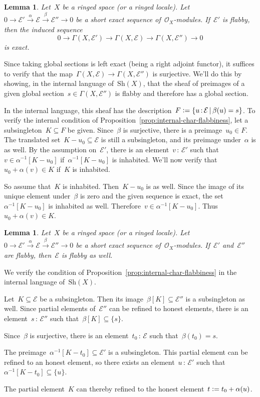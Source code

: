 \documentclass[10pt,reqno,a4paper]{amsbook}
\makeatletter
\theoremstyle{definition}
\theoremstyle{plain}
\newtheorem{lemma}[defn]{Lemma}
\theoremstyle{remark}
\newcommand{\E}{\mathcal{E}}
\renewcommand{\O}{\mathcal{O}}
\newcommand{\Sh}{\mathrm{Sh}}
\newcommand{\?}{\,{:}\,}
\renewcommand{\_}{\mathpunct{.}\,}
\newcommand{\xra}{\xrightarrow}
\newcommand{\defeq}{\vcentcolon=}
\renewenvironment{proof}[1][\proofname]{\par
  \pushQED{\qed}%
  \normalfont \topsep6\p@\@plus6\p@\relax
  \trivlist
  \item[\hskip\labelsep
        \itshape
    #1\@addpunct{.}]\ignorespaces
}{%
  \popQED\endtrivlist\@endpefalse
}
\makeatother
\begin{document}
\begin{lemma}Let~$X$ be a ringed space (or a ringed locale). Let~$0 \to \E'
\xra{\alpha} \E \xra{\beta} \E'' \to 0$ be a short exact sequence
of~$\O_X$-modules. If~$\E'$ is flabby, then the induced sequence
\[ 0 \longrightarrow \Gamma(X,\E')
  \longrightarrow \Gamma(X,\E)
  \longrightarrow \Gamma(X,\E'') \longrightarrow 0 \]
is exact.
\end{lemma}

\begin{proof}Since taking global sections is left exact (being a right adjoint
functor), it suffices to verify that the map~$\Gamma(X,\E) \to \Gamma(X,\E'')$
is surjective. We'll do this by showing, in the internal language of~$\Sh(X)$,
that the sheaf of preimages of a given global section~$s \in \Gamma(X,\E'')$ is
flabby and therefore has a global section.

In the internal language, this sheaf has the description~$F \defeq \{ u \? \E
\,|\, \beta(u) = s \}$. To verify the internal condition of
Proposition~\ref{prop:internal-char-flabbiness}, let a subsingleton~$K \subseteq
F$ be given. Since~$\beta$ is surjective, there is a preimage~$u_0 \in F$.
The translated set~$K - u_0 \subseteq \E$ is still a subsingleton, and its
preimage under~$\alpha$ is as well. By the assumption on~$\E'$, there is an
element~$v \? \E'$ such that~$v \in \alpha^{-1}[K - u_0]$ if~$\alpha^{-1}[K - u_0]$ is
inhabited. We'll now verify that~$u_0 + \alpha(v) \in K$ if~$K$ is inhabited.

So assume that~$K$ is inhabited. Then~$K - u_0$ is as well. Since the image of
its unique element under~$\beta$ is zero and the given sequence is exact, the
set~$\alpha^{-1}[K - u_0]$ is inhabited as well. Therefore~$v \in \alpha^{-1}[K
- u_0]$. Thus~$u_0 + \alpha(v) \in K$.
\end{proof}

\begin{lemma}Let~$X$ be a ringed space (or a ringed locale). Let~$0 \to \E'
\xra{\alpha} \E \xra{\beta} \E'' \to 0$ be a short exact sequence
of~$\O_X$-modules. If~$\E'$ and~$\E''$ are flabby, then~$\E$ is flabby as well.
\end{lemma}

\begin{proof}We verify the condition of
Proposition~\ref{prop:internal-char-flabbiness} in the internal language
of~$\Sh(X)$.

Let~$K \subseteq \E$ be a subsingleton. Then its image~$\beta[K] \subseteq \E''$
is a subsingleton as well. Since partial elements of~$\E''$ can be refined to
honest elements, there is an element~$s \? \E''$ such that~$\beta[K] \subseteq
\{ s \}$.

Since~$\beta$ is surjective, there is an element~$t_0 \? \E$ such
that~$\beta(t_0) = s$.

The preimage~$\alpha^{-1}[K - t_0] \subseteq \E'$ is a subsingleton. This
partial element can be refined to an honest element, so there exists an
element~$u \? \E'$ such that~$\alpha^{-1}[K - t_0] \subseteq \{u\}$.

The partial element~$K$ can thereby refined to the honest element~$t \defeq t_0 + \alpha(u)$.
\end{proof}
\end{document}
